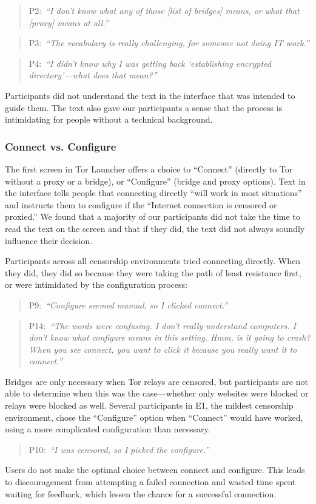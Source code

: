 \documentclass[USenglish,oneside,twocolumn]{article}
\newcommand{\pquote}[2]{
\begin{quotation}
\noindent #1:~\textit{``#2''}
\end{quotation}
}
\begin{document}
\pquote{P2}{I don't know what any of those [list of bridges] means, or what that [proxy] means at all.}
\pquote{P3}{The vocabulary is really challenging, for someone not doing IT work.}
\pquote{P4}{I didn't know why I was getting back `establishing encrypted directory'---what does that mean?}
Participants did not understand the text in the interface that was intended to guide them. The text also gave our participants a sense that the process is intimidating for people without a technical background. 

\subsubsection{Connect vs. Configure} 
The first screen in Tor Launcher offers a choice to
``Connect'' (directly to Tor without a proxy or a bridge),
or ``Configure'' (bridge and proxy options).
Text in the interface tells people that connecting directly ``will work in most situations'' and instructs them to configure if the ``Internet connection is censored or proxied.'' We found that a majority of our participants did not take the time to read the text on the screen and that if they did, the text did not always soundly influence their decision.

Participants across all censorship environments tried connecting directly. When they did, they did so because they were taking the path of least resistance first, or were intimidated by the configuration process:
\pquote{P9}{Configure seemed manual, so I clicked connect.}
\pquote{P14}{The words were confusing. I don't really understand computers. I don't know what configure means in this setting. Hmm, is it going to crash? When you see connect, you want to click it because you really want it to connect.}

Bridges are only necessary when Tor relays are censored, but participants are not able to determine when this was the case---whether only websites were blocked or relays were blocked as well. Several participants in E1, the mildest censorship environment, chose the ``Configure'' option when ``Connect'' would have worked, using a more complicated configuration than necessary.

\pquote{P10}{I was censored, so I picked the configure.}

Users do not make the optimal choice between connect and configure. This leads to discouragement from attempting a failed connection and wasted time spent waiting for feedback, which lessen the chance for a successful connection. 
\end{document}
